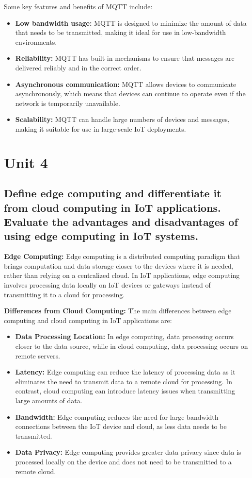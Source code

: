 \documentclass[12pt, a4paper, oneside]{article}
\begin{document}
Some key features and benefits of MQTT include:

\begin{itemize}
	\item \textbf{Low bandwidth usage:} MQTT is designed to minimize the amount of data that needs to be transmitted, making it ideal for use in low-bandwidth environments.
	\item \textbf{Reliability:} MQTT has built-in mechanisms to ensure that messages are delivered reliably and in the correct order.
	\item \textbf{Asynchronous communication:} MQTT allows devices to communicate asynchronously, which means that devices can continue to operate even if the network is temporarily unavailable.
	\item \textbf{Scalability:} MQTT can handle large numbers of devices and messages, making it suitable for use in large-scale IoT deployments.
\end{itemize}

\section{Unit 4}

\subsection{Define edge computing and differentiate it from cloud computing in IoT applications. Evaluate the advantages and disadvantages of using edge computing in IoT systems.}

\textbf{Edge Computing:} Edge computing is a distributed computing paradigm that brings computation and data storage closer to the devices where it is needed, rather than relying on a centralized cloud. In IoT applications, edge computing involves processing data locally on IoT devices or gateways instead of transmitting it to a cloud for processing.

\textbf{Differences from Cloud Computing:} The main differences between edge computing and cloud computing in IoT applications are:

\begin{itemize}
	\item \textbf{Data Processing Location:} In edge computing, data processing occurs closer to the data source, while in cloud computing, data processing occurs on remote servers.
	\item \textbf{Latency:} Edge computing can reduce the latency of processing data as it eliminates the need to transmit data to a remote cloud for processing. In contrast, cloud computing can introduce latency issues when transmitting large amounts of data.
	\item \textbf{Bandwidth:} Edge computing reduces the need for large bandwidth connections between the IoT device and cloud, as less data needs to be transmitted.
	\item \textbf{Data Privacy:} Edge computing provides greater data privacy since data is processed locally on the device and does not need to be transmitted to a remote cloud.
\end{itemize}
\end{document}
